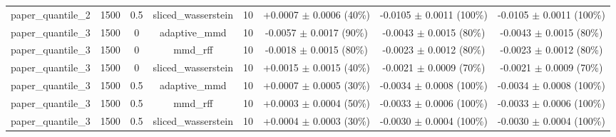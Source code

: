 \begin{table}[h]
\begin{adjustbox}{max width=\textwidth}
\begin{tabular}{lccccccc}
    paper\_quantile\_2 & 1500 & 0.5 & sliced\_wasserstein & 10 & +0.0007 $\pm$ 0.0006 (40\%) & -0.0105 $\pm$ 0.0011 (100\%) & -0.0105 $\pm$ 0.0011 (100\%) \\
    paper\_quantile\_3 & 1500 & 0 & adaptive\_mmd & 10 & -0.0057 $\pm$ 0.0017 (90\%) & -0.0043 $\pm$ 0.0015 (80\%) & -0.0043 $\pm$ 0.0015 (80\%) \\
    paper\_quantile\_3 & 1500 & 0 & mmd\_rff & 10 & -0.0018 $\pm$ 0.0015 (80\%) & -0.0023 $\pm$ 0.0012 (80\%) & -0.0023 $\pm$ 0.0012 (80\%) \\
    paper\_quantile\_3 & 1500 & 0 & sliced\_wasserstein & 10 & +0.0015 $\pm$ 0.0015 (40\%) & -0.0021 $\pm$ 0.0009 (70\%) & -0.0021 $\pm$ 0.0009 (70\%) \\
    paper\_quantile\_3 & 1500 & 0.5 & adaptive\_mmd & 10 & +0.0007 $\pm$ 0.0005 (30\%) & -0.0034 $\pm$ 0.0008 (100\%) & -0.0034 $\pm$ 0.0008 (100\%) \\
    paper\_quantile\_3 & 1500 & 0.5 & mmd\_rff & 10 & +0.0003 $\pm$ 0.0004 (50\%) & -0.0033 $\pm$ 0.0006 (100\%) & -0.0033 $\pm$ 0.0006 (100\%) \\
    paper\_quantile\_3 & 1500 & 0.5 & sliced\_wasserstein & 10 & +0.0004 $\pm$ 0.0003 (30\%) & -0.0030 $\pm$ 0.0004 (100\%) & -0.0030 $\pm$ 0.0004 (100\%) \\
    \bottomrule
  \end{tabular}
  \end{adjustbox}
\end{table}
